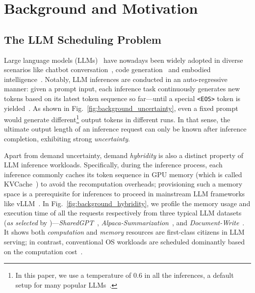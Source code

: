 \section{Background and Motivation}
\label{sec:background}


\subsection{The LLM Scheduling Problem}
\label{subsec:problem}

Large language models (LLMs)~\cite{deepseek, llama_official} have nowadays been widely adopted in diverse scenarios like chatbot conversation~\cite{openai_chatgpt}, code generation~\cite{cursor_ai} and embodied intelligence~\cite{wang2023voyager}.
Notably, LLM inferences are conducted in an auto-regressive manner: given a prompt input, each inference task continuously generates new tokens based on its latest token sequence so far---until a special \texttt{<EOS>} token is yielded~\cite{yu2022orca}.
As shown in Fig.~\ref{fig:background_uncertainty}, even a fixed prompt would generate different\footnote{In this paper, we use a temperature of 0.6 in all the inferences, a default setup for many popular LLMs~\cite{llama3_1_8b_instruct,qwen3_32b}.}
output tokens in different runs.
In that sense, the ultimate output length of an inference request can only be known after inference completion, exhibiting strong \emph{uncertainty}.

Apart from demand {uncertainty}, demand \emph{hybridity} is also a distinct property of LLM inference workloads. 
Specifically, during the inference process, each inference commonly caches its token sequence in GPU memory (which is called KVCache~\cite{qin2024mooncake}) to avoid the recomputation overheads; provisioning such a memory space is a prerequisite for inferences to proceed in mainstream LLM frameworks like vLLM~\cite{vllm_v0_8_2}.
In Fig.~\ref{fig:background_hybridity}, we profile the memory usage and execution time of all the requests respectively from three typical LLM datasets (\emph{as selected} by \cite{hu2024inference})---\emph{SharedGPT}~\cite{sharegpt_vicuna_unfiltered_2025}, \emph{Alpaca-Summarization}~\cite{alpaca_pubmed_summarization_2025}, and \emph{{Document-Write}}~\cite{write_doc_sft_v1_2025}.
It shows both \emph{computation} and \emph{memory} resources are first-class citizens in LLM serving; in contrast, conventional OS workloads are scheduled dominantly based on the computation cost~\cite{cpu_scheduling_comparison_gfg_2026}. %

